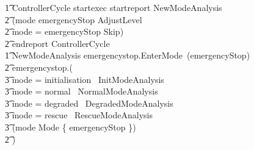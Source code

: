 \documentclass{report} %
\begin{document}
\begin{circusaction}
        \t1 ControllerCycle \circdef startexec \then startreport \then NewModeAnalysis \circseq\ \\
                \t2 (\lcircguard mode \neq emergencyStop \rcircguard \circguard AdjustLevel \extchoice \\
                \t2 \lcircguard mode = emergencyStop \rcircguard \circguard Skip) \circseq \\
                \t2 endreport \then ControllerCycle \\
        \t1 NewModeAnalysis \circdef emergencystop.\true \then EnterMode~(emergencyStop) \\
            \t2 \extchoice 
            emergencystop.\false \then ( \\
                \t3 \lcircguard mode = initialisation \rcircguard \circguard\ InitModeAnalysis \\
                \t3 \extchoice \lcircguard mode = normal \rcircguard \circguard\ NormalModeAnalysis \\
                \t3 \extchoice \lcircguard mode = degraded \rcircguard \circguard\ DegradedModeAnalysis \\
                \t3 \extchoice \lcircguard mode = rescue \rcircguard \circguard\ RescueModeAnalysis \\
                \t3 \extchoice \lcircguard (mode \notin Mode \setminus \{ emergencyStop \}) \rcircguard \circguard\ \Skip \\
                \t2 ) \\
\end{circusaction}
\end{document}
